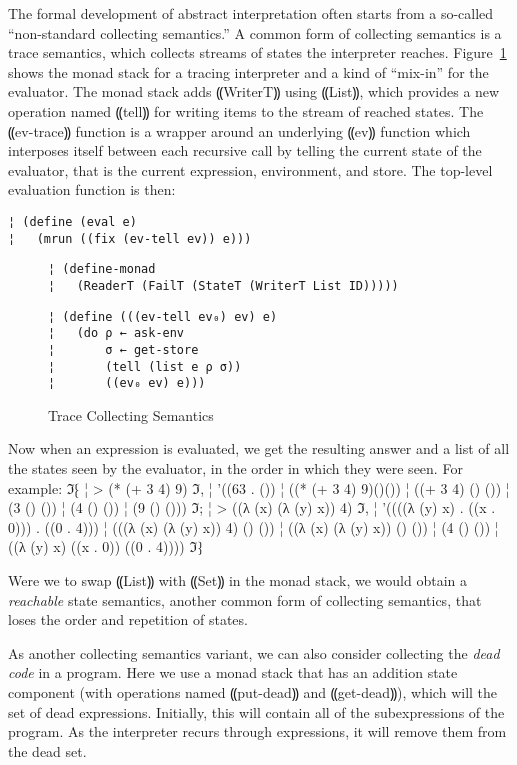The formal development of abstract interpretation often starts from a
so-called ``non-standard collecting semantics.''  A common form of
collecting semantics is a trace semantics, which collects streams of
states the interpreter reaches.  Figure~\ref{f:trace} shows the monad
stack for a tracing interpreter and a kind of ``mix-in'' for the
evaluator.  The monad stack adds ⸨WriterT⸩ using
⸨List⸩, which provides a new operation named ⸨tell⸩ for
writing items to the stream of reached states.  The ⸨ev-trace⸩
function is a wrapper around an underlying ⸨ev⸩ function which
interposes itself between each recursive call by telling the current
state of the evaluator, that is the current expression, environment,
and store.  The top-level evaluation function is then:
\begin{lstlisting}
¦ (define (eval e) 
¦   (mrun ((fix (ev-tell ev)) e)))
\end{lstlisting}

\begin{figure}
\begin{lstlisting}
¦ (define-monad
¦   (ReaderT (FailT (StateT (WriterT List ID)))))
\end{lstlisting}
\figskip{}
\begin{lstlisting}
¦ (define (((ev-tell ev₀) ev) e)
¦   (do ρ ← ask-env
¦       σ ← get-store
¦       (tell (list e ρ σ))
¦       ((ev₀ ev) e)))
\end{lstlisting}
\caption{Trace Collecting Semantics}
\label{f:trace}
\end{figure}

Now when an expression is evaluated, we get the resulting answer and a list of
all the states seen by the evaluator, in the order in which they were seen.
For example:
ℑ⁅
¦ > (* (+ 3 4) 9)
ℑ,
¦ '((63 . ())
¦   ((* (+ 3 4) 9)()())
¦   ((+ 3 4) () ())
¦   (3 () ())
¦   (4 () ())
¦   (9 () ()))
ℑ;
¦ > ((λ (x) (λ (y) x)) 4)
ℑ,
¦ '((((λ (y) x) . ((x . 0))) . ((0 . 4)))
¦   (((λ (x) (λ (y) x)) 4) () ())
¦   ((λ (x) (λ (y) x)) () ())
¦   (4 () ())
¦   ((λ (y) x) ((x . 0)) ((0 . 4))))
ℑ⁆

Were we to swap ⸨List⸩ with ⸨Set⸩ in the monad stack, we would obtain a
\emph{reachable} state semantics, another common form of collecting semantics,
that loses the order and repetition of states.

As another collecting semantics variant, we can also consider collecting the
\emph{dead code} in a program.  Here we use a monad stack that has an addition
state component (with operations named ⸨put-dead⸩ and ⸨get-dead⸩), which will
the set of dead expressions.  Initially, this will contain all of the
subexpressions of the program.  As the interpreter recurs through expressions,
it will remove them from the dead set.

